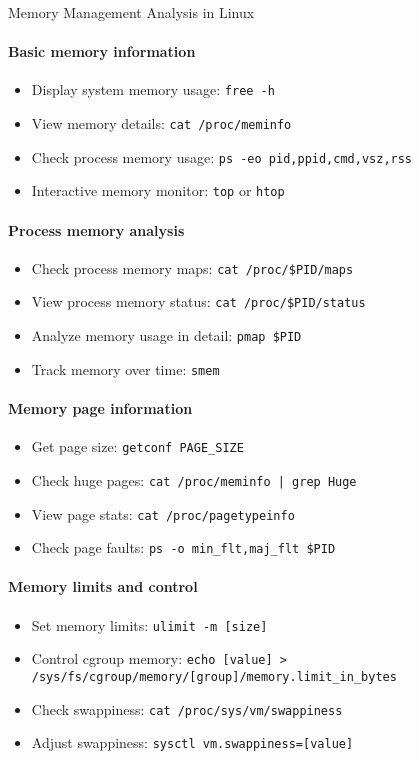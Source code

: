 \begin{KR}{Memory Management Analysis in Linux}\\
    \paragraph{Basic memory information}
    \begin{itemize}
        \item Display system memory usage: \texttt{free -h}
        \item View memory details: \texttt{cat /proc/meminfo}
        \item Check process memory usage: \texttt{ps -eo pid,ppid,cmd,vsz,rss}
        \item Interactive memory monitor: \texttt{top} or \texttt{htop}
    \end{itemize}
    
    \paragraph{Process memory analysis}
    \begin{itemize}
        \item Check process memory maps: \texttt{cat /proc/\$PID/maps}
        \item View process memory status: \texttt{cat /proc/\$PID/status}
        \item Analyze memory usage in detail: \texttt{pmap \$PID}
        \item Track memory over time: \texttt{smem}
    \end{itemize}
    
    \paragraph{Memory page information}
    \begin{itemize}
        \item Get page size: \texttt{getconf PAGE\_SIZE}
        \item Check huge pages: \texttt{cat /proc/meminfo | grep Huge}
        \item View page stats: \texttt{cat /proc/pagetypeinfo}
        \item Check page faults: \texttt{ps -o min\_flt,maj\_flt \$PID}
    \end{itemize}
    
    \paragraph{Memory limits and control}
    \begin{itemize}
        \item Set memory limits: \texttt{ulimit -m [size]}
        \item Control cgroup memory: \texttt{echo [value] > /sys/fs/cgroup/memory/[group]/memory.limit\_in\_bytes}
        \item Check swappiness: \texttt{cat /proc/sys/vm/swappiness}
        \item Adjust swappiness: \texttt{sysctl vm.swappiness=[value]}
    \end{itemize}
\end{KR}

